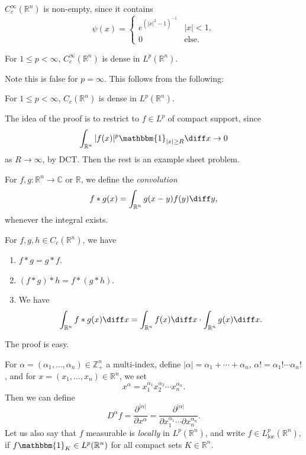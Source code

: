 \documentclass[12pt]{article}
\begin{document}
\begin{remark}
	$C^\infty_c(\mathbb{R}^n)$ is non-empty, since it contains
	\[
	\psi(x) =
	\begin{cases}
		e^{(|x|^2-1)^{-1}} & |x| < 1, \\
		0 & \text{else}.
	\end{cases}
	\]
\end{remark}

\begin{theorem}
	For $1 \leq p < \infty$, $C^\infty_c(\mathbb{R}^n)$ is dense in $L^p(\mathbb{R}^n)$.
\end{theorem}

Note this is false for $p = \infty$. This follows from the following:

\begin{proposition}
	For $1 \leq p < \infty$,  $C_c(\mathbb{R}^n)$ is dense in $L^p(\mathbb{R}^n)$.
\end{proposition}

The idea of the proof is to restrict to $f \in L^p$ of compact support, since
\[
\int_{\mathbb{R}^n} |f(x)|^p \mathbbm{1}_{|x| \geq R} \diff x \to 0
\]
as $R \to \infty$, by DCT. Then the rest is an example sheet problem.


\begin{definition}
	For $f, g : \mathbb{R}^n \to \mathbb{C}$ or $\mathbb{R}$, we define the \emph{convolution}
	\[
	f \ast g(x) = \int_{\mathbb{R}^n} g(x - y) f(y) \diff y,
	\]
	whenever the integral exists.
\end{definition}

\begin{proposition}
	For $f, g, h \in C_c(\mathbb{R}^n)$, we have
	\begin{enumerate}[\normalfont(i)]
		\item $f \ast g = g \ast f$.
		\item $(f \ast g) \ast h = f \ast (g \ast h)$.
		\item We have
			\[
				\int_{\mathbb{R}^n} f \ast g(x) \diff x = \int_{\mathbb{R}^n} f(x) \diff x \cdot \int_{\mathbb{R}^n} g(x) \diff x.
			\]
	\end{enumerate}
\end{proposition}

The proof is easy.

For $\alpha = (\alpha_1, \ldots, \alpha_n) \in \mathbb{Z}_+^n$ a multi-index, define $|\alpha| = \alpha_1 + \cdots + \alpha_n$, $\alpha! = \alpha_1! \cdots \alpha_n!$, and for $x = (x_1, \ldots, x_n) \in \mathbb{R}^n$, we set
\[
x^\alpha = x_1^{\alpha_1} x_2^{\alpha_2} \cdots x_n^{\alpha_n}.
\]
Then we can define
\[
D^\alpha f = \frac{\partial^{|\alpha|}}{\partial x^{\alpha}} = \frac{\partial^{|\alpha|}}{\partial x_1^{\alpha_1} \cdots \partial x_n^{\alpha_n}}.
\]
Let us also say that $f$ measurable is \emph{locally} in $L^p(\mathbb{R}^n)$, and write $f \in L^p_{\mathrm{loc}}(\mathbb{R}^n)$, if $f \mathbbm{1}_{K} \in L^p(\mathbb{R}^n)$ for all compact sets $K \in \mathbb{R}^n$.
\end{document}
